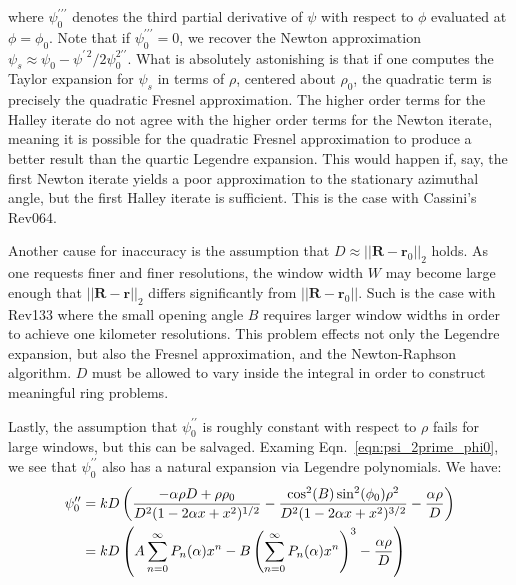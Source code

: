 \documentclass{article}
\theoremstyle{plain}
\begin{document}
        where $\psi^{\prime\prime\prime}_{0}$ denotes the third partial
        derivative of $\psi$ with respect to $\phi$ evaluated at
        $\phi=\phi_{0}$. Note that if $\psi^{\prime\prime\prime}_{0}=0$,
        we recover the Newton approximation
        $\psi_{s}\approx\psi_{0}-\psi^{\prime\,2}/2\psi^{2\prime\prime}_{0}$.
        What is absolutely astonishing is that if one computes the Taylor
        expansion for $\psi_{s}$ in terms of $\rho$, centered about
        $\rho_{0}$, the quadratic term is precisely the quadratic Fresnel
        approximation. The higher order terms for the Halley iterate do not
        agree with the higher order terms for the Newton iterate, meaning it is
        possible for the quadratic Fresnel approximation to produce a better
        result than the quartic Legendre expansion. This would happen if, say,
        the first Newton iterate yields a poor approximation to the stationary
        azimuthal angle, but the first Halley iterate is sufficient. This is
        the case with Cassini's Rev064.
        \par\hfill\par
        Another cause for inaccuracy is the assumption that
        $D\approx||\mathbf{R}-\mathbf{r}_{0}||_{2}$ holds. As one requests
        finer and finer resolutions, the window width $W$ may become large
        enough that $||\mathbf{R}-\mathbf{r}||_{2}$ differs significantly from
        $||\mathbf{R}-\mathbf{r}_{0}||$. Such is the case with Rev133 where the
        small opening angle $B$ requires larger window widths in order to
        achieve one kilometer resolutions. This problem effects not only the
        Legendre expansion, but also the Fresnel approximation,
        and the Newton-Raphson algorithm.
        $D$ must be allowed to vary inside the integral in order to construct
        meaningful ring problems.
        \par\hfill\par
        Lastly, the assumption that $\psi^{\prime\prime}_{0}$ is roughly
        constant with respect to $\rho$ fails for large windows, but this can be
        salvaged. Examing Eqn.~\ref{eqn:psi_2prime_phi0}, we see that
        $\psi^{\prime\prime}_{0}$ also has a natural expansion via Legendre
        polynomials. We have:
        \begin{subequations}
            \begin{align}
                \psi^{\prime\prime}_{0}
                &=kD\left(
                    \frac{%
                        -\alpha\rho{D}+\rho\rho_{0}
                    }{%
                        D^{2}(1-2\alpha{x}+x^{2})^{1/2}
                    }
                    -\frac{%
                        \cos^{2}(B)\sin^{2}(\phi_{0})\rho^{2}
                    }{%
                        D^{2}(1-2\alpha{x}+x^{2})^{3/2}
                    }
                    -\frac{\alpha\rho}{D}
                \right)\\
                &=kD\left(
                    A\sum_{n=0}^{\infty}P_{n}(\alpha)x^{n}
                    -B\left(\sum_{n=0}^{\infty}P_{n}(\alpha)x^{n}\right)^{3}
                    -\frac{\alpha\rho}{D}
                \right)
            \end{align}
        \end{subequations}
\end{document}

